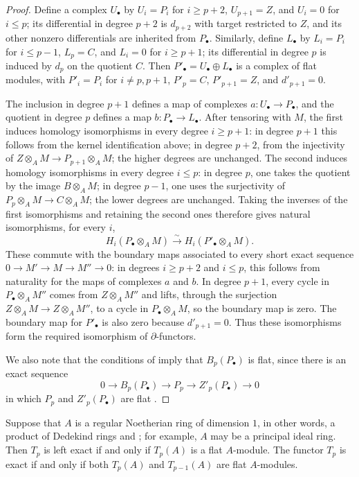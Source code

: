 \begin{proof}
Define a complex $U_\bullet$ by $U_i=P_i$ for $i\geq p+2$,
$U_{p+1}=Z$, and $U_i=0$ for $i\leq p$; its differential in degree
$p+2$ is $d_{p+2}$ with target restricted to $Z$, and its other nonzero
differentials are inherited from $P_\bullet$. Similarly, define
$L_\bullet$ by $L_i=P_i$ for $i\leq p-1$, $L_p=C$, and $L_i=0$
for $i\geq p+1$; its differential in degree $p$ is induced by $d_p$
on the quotient $C$.
Then $P'_\bullet=U_\bullet\oplus L_\bullet$ is a complex of flat
modules, with $P'_i=P_i$ for $i\ne p,p+1$, $P'_p=C$,
$P'_{p+1}=Z$, and $d'_{p+1}=0$.

The inclusion in degree $p+1$ defines a map of complexes
$a:U_\bullet\to P_\bullet$, and the quotient in degree $p$ defines
a map $b:P_\bullet\to L_\bullet$. After tensoring with $M$, the
first induces homology isomorphisms in every degree $i\geq p+1$:
in degree $p+1$ this follows from the kernel identification above;
in degree $p+2$, from the injectivity of
$Z\otimes_A M\to P_{p+1}\otimes_A M$; the higher degrees are
unchanged. The second induces homology isomorphisms in every degree
$i\leq p$: in degree $p$, one takes the quotient by the image
$B\otimes_A M$; in degree $p-1$, one uses the surjectivity of
$P_p\otimes_A M\to C\otimes_A M$; the lower degrees are unchanged.
Taking the inverses of the first isomorphisms and retaining the second
ones therefore gives natural isomorphisms, for every $i$,
\[
 H_i(P_\bullet\otimes_A M)\xrightarrow{\sim}
 H_i(P'_\bullet\otimes_A M).
\]
These commute with the boundary maps associated to every short exact
sequence $0\to M'\to M\to M''\to0$: in degrees $i\geq p+2$ and
$i\leq p$, this follows from naturality for the maps of complexes $a$
and $b$. In degree $p+1$, every cycle in $P_\bullet\otimes_A M''$
comes from $Z\otimes_A M''$ and lifts, through the surjection
$Z\otimes_A M\to Z\otimes_A M''$, to a cycle in
$P_\bullet\otimes_A M$, so the boundary map is zero. The boundary
map for $P'_\bullet$ is also zero because $d'_{p+1}=0$.
Thus these isomorphisms form the required isomorphism of
$\partial$-functors.

We also note that the conditions of  imply
that $B_p(P_\bullet)$ is flat, since there is an exact sequence
\[
  0
  \longrightarrow B_p(P_\bullet)
  \longrightarrow P_p
  \longrightarrow Z'_p(P_\bullet)
  \longrightarrow 0
\]
in which $P_p$ and $Z'_p(P_\bullet)$ are flat
.
\end{proof}

\begin{corollary}[7.4.3]
\label{III.7.4.3}
Suppose that $A$ is a regular Noetherian ring of dimension
$1$, in other words, a product of Dedekind rings
 and ; for example, $A$
may be a principal ideal ring.  Then $T_p$ is left exact if
and only if $T_p(A)$ is a flat $A$-module.  The functor $T_p$
is exact if and only if both $T_p(A)$ and $T_{p-1}(A)$ are
flat $A$-modules.
\end{corollary}

